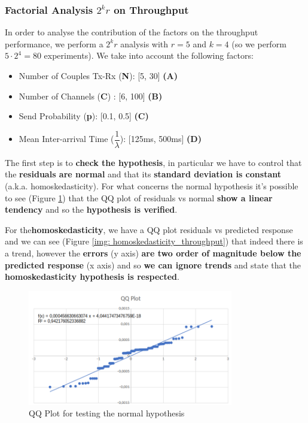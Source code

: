 \subsubsection{Factorial Analysis $2^kr$ on Throughput}
In order to analyse the contribution of the factors on the throughput performance, we perform a $2^kr$ analysis with $r=5$ and $k=4$ (so we perform $5\cdot2^4 = 80$ experiments). We take into account the following factors:
\begin{itemize}
	\item Number of Couples Tx-Rx (\textbf{N}): [5, 30] \textbf{(A)}
	\item Number of Channels (\textbf{C}) : [6, 100] \textbf{(B)}
	\item Send Probability (\textbf{p}): [0.1, 0.5] \textbf{(C)}
	\item Mean Inter-arrival Time ($\dfrac{1}{\lambda}$): [125ms, 500ms] \textbf{(D)}    
\end{itemize}

\noindent The first step is to \textbf{check the hypothesis}, in particular we have to control that the \textbf{residuals are normal} and that its \textbf{standard deviation is constant} (a.k.a. homoskedasticity). For what concerns the normal hypothesis it's possible to see (Figure \ref{img: qqplot_throughput}) that the QQ plot of residuals vs normal \textbf{show a linear tendency} and so the \textbf{hypothesis is verified}.

\noindent For the\textbf{homoskedasticity}, we have a QQ plot residuals vs predicted response and we can see (Figure \ref{img: homoskedasticity_throughput}) that indeed there is a trend, however the \textbf{errors} (y axis) \textbf{are two order of magnitude below the predicted response} (x axis) and so \textbf{we can ignore trends} and state that the \textbf{homoskedasticity hypothesis is respected}.

\begin{figure}[H]
	\centering
	\includegraphics[width=0.8\textwidth]{img/QQplot_2kr_throughput.png}
	\caption{QQ Plot for testing the normal hypothesis}
	\label {img: qqplot_throughput}
\end{figure}

